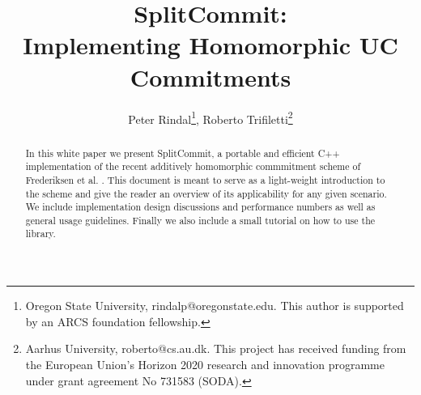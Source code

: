 \documentclass{article}
\begin{document}
	
	\title{SplitCommit:\\ Implementing Homomorphic UC Commitments}
	
	
	\author{
		Peter Rindal\thanks{Oregon State University,  {\sf rindalp@oregonstate.edu}. This author is supported by an ARCS foundation fellowship.}, Roberto  Trifiletti\thanks{Aarhus University, {\sf roberto@cs.au.dk}. This project has received funding from the European Union's Horizon 2020 research and innovation programme under grant agreement No 731583 (SODA).}
		}

	\date{}

	\maketitle
	

	
	\begin{abstract}
	In this white paper we present SplitCommit, a portable and efficient C++ implementation of the recent additively homomorphic commmitment scheme of Frederiksen et al. \cite{DBLP:conf/tcc/FrederiksenJNT16}. This document is meant to serve as a light-weight introduction to the scheme and give the reader an overview of its applicability for any given scenario. We include implementation design discussions and performance numbers as well as general usage guidelines. Finally we also include a small tutorial on how to use the library.

	\end{abstract}
	
	
	\pagestyle{plain}
	
	
	
	
	

	
	
	
	
	
	
	
	
	
	
\end{document}
